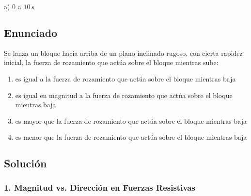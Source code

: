 \documentclass[12pt, a4paper]{article}
\begin{document}
\begin{tcolorbox}[colback=green!5!white, colframe=green!50!black, title=Respuesta Final]
\centering \Large a) $0$ a $10\,\si{s}$
\end{tcolorbox}

\newpage

\subsection*{Enunciado}
Se lanza un bloque hacia arriba de un plano inclinado rugoso, con cierta rapidez inicial, la fuerza de rozamiento que actúa sobre el bloque mientras sube:
\begin{enumerate}[label=\alph*)]
    \item es igual a la fuerza de rozamiento que actúa sobre el bloque mientras baja
    \item es igual en magnitud a la fuerza de rozamiento que actúa sobre el bloque mientras baja
    \item es mayor que la fuerza de rozamiento que actúa sobre el bloque mientras baja
    \item es menor que la fuerza de rozamiento que actúa sobre el bloque mientras baja
\end{enumerate}

\subsection*{Solución}

\subsubsection*{1. Magnitud vs. Dirección en Fuerzas Resistivas}
\end{document}
